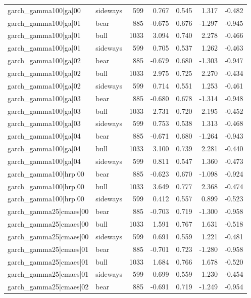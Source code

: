 \begin{table}
\begin{tabular}{llrrrrr}
garch\_gamma100|ga|00 & sideways & 599 & 0.767 & 0.545 & 1.317 & -0.482 \\
garch\_gamma100|ga|01 & bear & 885 & -0.675 & 0.676 & -1.297 & -0.945 \\
garch\_gamma100|ga|01 & bull & 1033 & 3.094 & 0.740 & 2.278 & -0.466 \\
garch\_gamma100|ga|01 & sideways & 599 & 0.705 & 0.537 & 1.262 & -0.463 \\
garch\_gamma100|ga|02 & bear & 885 & -0.679 & 0.680 & -1.303 & -0.947 \\
garch\_gamma100|ga|02 & bull & 1033 & 2.975 & 0.725 & 2.270 & -0.434 \\
garch\_gamma100|ga|02 & sideways & 599 & 0.714 & 0.551 & 1.253 & -0.461 \\
garch\_gamma100|ga|03 & bear & 885 & -0.680 & 0.678 & -1.314 & -0.948 \\
garch\_gamma100|ga|03 & bull & 1033 & 2.731 & 0.720 & 2.195 & -0.452 \\
garch\_gamma100|ga|03 & sideways & 599 & 0.753 & 0.538 & 1.313 & -0.468 \\
garch\_gamma100|ga|04 & bear & 885 & -0.671 & 0.680 & -1.264 & -0.943 \\
garch\_gamma100|ga|04 & bull & 1033 & 3.100 & 0.739 & 2.281 & -0.440 \\
garch\_gamma100|ga|04 & sideways & 599 & 0.811 & 0.547 & 1.360 & -0.473 \\
garch\_gamma100|hrp|00 & bear & 885 & -0.623 & 0.670 & -1.098 & -0.924 \\
garch\_gamma100|hrp|00 & bull & 1033 & 3.649 & 0.777 & 2.368 & -0.474 \\
garch\_gamma100|hrp|00 & sideways & 599 & 0.412 & 0.557 & 0.899 & -0.523 \\
garch\_gamma25|cmaes|00 & bear & 885 & -0.703 & 0.719 & -1.300 & -0.958 \\
garch\_gamma25|cmaes|00 & bull & 1033 & 1.591 & 0.767 & 1.631 & -0.518 \\
garch\_gamma25|cmaes|00 & sideways & 599 & 0.691 & 0.559 & 1.221 & -0.481 \\
garch\_gamma25|cmaes|01 & bear & 885 & -0.701 & 0.723 & -1.280 & -0.958 \\
garch\_gamma25|cmaes|01 & bull & 1033 & 1.684 & 0.766 & 1.678 & -0.520 \\
garch\_gamma25|cmaes|01 & sideways & 599 & 0.699 & 0.559 & 1.230 & -0.454 \\
garch\_gamma25|cmaes|02 & bear & 885 & -0.691 & 0.719 & -1.249 & -0.954 \\

\end{tabular}
\end{table}
